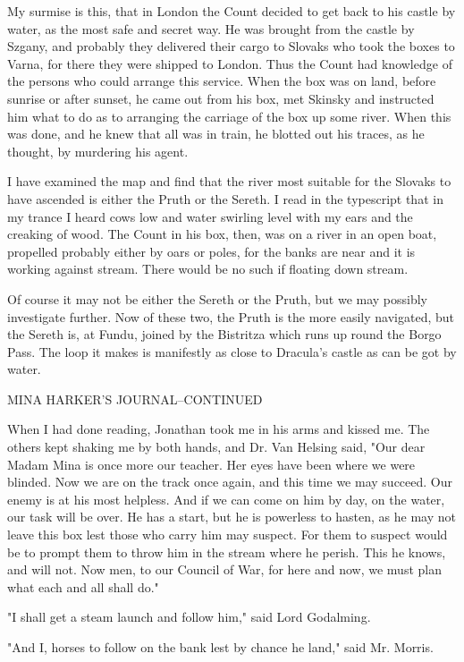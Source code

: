 My surmise is this, that in London the Count decided to get back to his castle by water, as the most safe and secret way. He was brought from the castle by Szgany, and probably they delivered their cargo to Slovaks who took the boxes to Varna, for there they were shipped to London. Thus the Count had knowledge of the persons who could arrange this service. When the box was on land, before sunrise or after sunset, he came out from his box, met Skinsky and instructed him what to do as to arranging the carriage of the box up some river. When this was done, and he knew that all was in train, he blotted out his traces, as he thought, by murdering his agent. 

I have examined the map and find that the river most suitable for the Slovaks to have ascended is either the Pruth or the Sereth. I read in the typescript that in my trance I heard cows low and water swirling level with my ears and the creaking of wood. The Count in his box, then, was on a river in an open boat, propelled probably either by oars or poles, for the banks are near and it is working against stream. There would be no such if floating down stream. 

Of course it may not be either the Sereth or the Pruth, but we may possibly investigate further. Now of these two, the Pruth is the more easily navigated, but the Sereth is, at Fundu, joined by the Bistritza which runs up round the Borgo Pass. The loop it makes is manifestly as close to Dracula's castle as can be got by water. 

MINA HARKER'S JOURNAL--CONTINUED 

When I had done reading, Jonathan took me in his arms and kissed me. The others kept shaking me by both hands, and Dr. Van Helsing said, "Our dear Madam Mina is once more our teacher. Her eyes have been where we were blinded. Now we are on the track once again, and this time we may succeed. Our enemy is at his most helpless. And if we can come on him by day, on the water, our task will be over. He has a start, but he is powerless to hasten, as he may not leave this box lest those who carry him may suspect. For them to suspect would be to prompt them to throw him in the stream where he perish. This he knows, and will not. Now men, to our Council of War, for here and now, we must plan what each and all shall do." 

"I shall get a steam launch and follow him," said Lord Godalming. 

"And I, horses to follow on the bank lest by chance he land," said Mr. Morris. 

